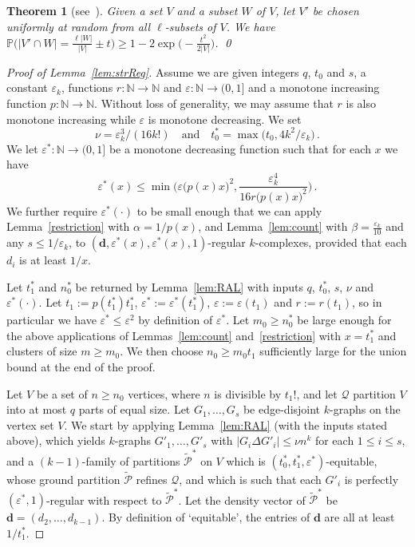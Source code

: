 \documentclass[12pt,a4paper]{amsart}
\let\eps\varepsilon
\newtheorem{theorem}{Theorem}%
\newcommand{\Prob}{\mathbb{P}}
\newcommand{\NATS}{\mathbb{N}}
\newcommand{\Part}{\mathcal{P}}
\newcommand{\Qart}{\mathcal{Q}}
\begin{document}
\begin{theorem}[see~{\cite[Theorem 2.10]{JaLuRu:Book}}]\label{thm:hypgeom}
Given a set $V$ and a subset $W$ of $V$, let $V'$ be chosen uniformly at random from all $\ell$-subsets of $V$. We have
$\Prob\Big(|V'\cap W|=\tfrac{\ell|W|}{|V|}\pm t\Big)\ge 1-2\exp\Big(-\tfrac{t^2}{2|V|}\Big)$.
\qed
\end{theorem}

\begin{proof}[Proof of Lemma~\ref{lem:strReg}]
Assume we are given integers $q$, $t_0$ and $s$,
a constant $\eps_k$, functions $r:\NATS\to\NATS$ and $\eps:\NATS\to(0,1]$ and a monotone increasing function
$p:\NATS\to\NATS$.
Without loss of generality, we may assume that $r$ is also monotone increasing
while $\eps$ is monotone decreasing.
We set
\[ \nu=\eps_k^3/(16k!)\quad\text{and}\quad t_0^*=\max\big(t_0,4k^2/\eps_k\big)\,.\]
We let $\eps^*:\NATS\to(0,1]$ be a monotone decreasing function such that for each $x$ we have
\begin{equation}\label{eq:strReg:epss}\eps^*(x)\le \min\Big(\eps\big(p(x)x\big)^2,
\frac{\eps_k^4}{16r\big(p(x)x\big)^2}\Big)\,.
\end{equation}
We further require $\eps^*(\cdot)$ to be small enough that we can apply
Lemma~\ref{restriction} with $\alpha=1/p(x)$, and Lemma~\ref{lem:count}
with $\beta=\tfrac{\eps_k}{10}$ and any $s\le1/\eps_k$, to
$(\mathbf{d},\eps^*(x),\eps^*(x),1)$-regular $k$-complexes, provided that
each $d_i$ is at least $1/x$.

Let $t_1^*$ and $n_0^*$ be returned by Lemma~\ref{lem:RAL} with inputs $q$,
$t_0^*$, $s$, $\nu$ and $\eps^*(\cdot)$. Let $t_1 :=p(t_1^*)t_1^*$, $\eps^*:=\eps^*(t_1^*)$, $\eps:=\eps(t_1)$ and $r:=r(t_1)$, so in particular we have $\eps^* \leq \eps^2$ by definition of $\eps^*$. Let $m_0\ge
n_0^*$ be large enough for the above applications of Lemmas~\ref{lem:count}
and~\ref{restriction} with $x=t_1^*$ and clusters of size $m\ge m_0$. We then
choose $n_0\ge m_0t_1$ sufficiently large for the union bound at the end of
the proof.

Let $V$ be a set of $n \geq n_0$ vertices, where $n$ is divisible by $t_1!$,
and let $\Qart$ partition $V$ into at most $q$ parts of equal size. Let
$G_1, \dots, G_s$ be edge-disjoint $k$-graphs on the vertex set $V$. We
start by applying Lemma~\ref{lem:RAL} (with the inputs stated above), which yields
$k$-graphs $G'_1,\ldots,G'_s$ with $|G_i\Delta G'_i| \leq \nu n^k$ for
each $1\le i\le s$, and a $(k-1)$-family of partitions $\tilde{\Part}^*$ on $V$ which is
$(t_0^*,t_1^*,\eps^*)$-equitable, whose ground
partition $\tilde{\Part}$ refines $\Qart$, and which is such that each $G'_i$ is perfectly
$(\eps^*,1)$-regular with respect to $\tilde{\Part}^*$. Let the density vector of
$\tilde{\Part}^*$ be $\mathbf{d}=(d_2,\ldots,d_{k-1})$. By definition of `equitable', the entries of $\mathbf{d}$ are all at least $1/t_1^*$.


\end{proof}
\end{document}
